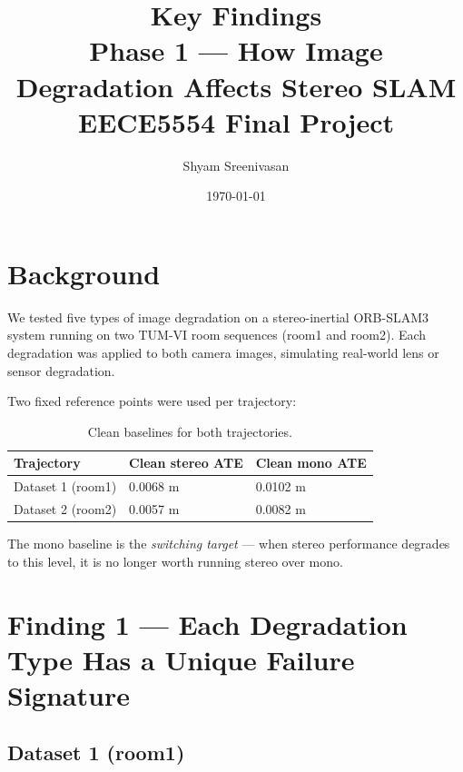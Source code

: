 \documentclass[11pt, a4paper]{article}
\title{
    \textbf{Key Findings} \\
    \large Phase 1 — How Image Degradation Affects Stereo SLAM \\
    \normalsize EECE5554 Final Project
}
\author{Shyam Sreenivasan}
\date{\today}
\begin{document}
\maketitle

\section{Background}

We tested five types of image degradation on a stereo-inertial ORB-SLAM3 system
running on two TUM-VI room sequences (room1 and room2). Each degradation was applied
to both camera images, simulating real-world lens or sensor degradation.

Two fixed reference points were used per trajectory:

\begin{table}[H]
\centering
\begin{tabular}{lll}
\toprule
\textbf{Trajectory} & \textbf{Clean stereo ATE} & \textbf{Clean mono ATE} \\
\midrule
Dataset 1 (room1) & 0.0068 m & 0.0102 m \\
Dataset 2 (room2) & 0.0057 m & 0.0082 m \\
\bottomrule
\end{tabular}
\caption{Clean baselines for both trajectories.}
\end{table}

The mono baseline is the \textit{switching target} --- when stereo performance
degrades to this level, it is no longer worth running stereo over mono.

\section{Finding 1 — Each Degradation Type Has a Unique Failure Signature}

\subsection{Dataset 1 (room1)}
\end{document}
